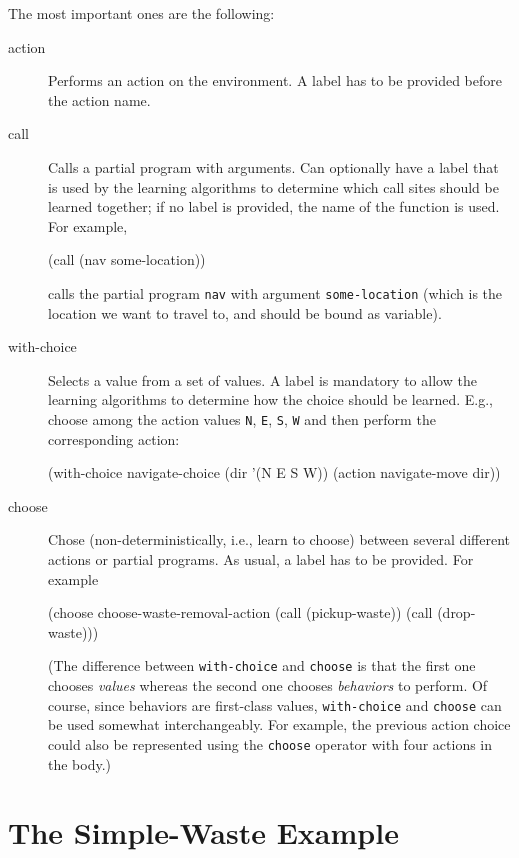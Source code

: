 \documentclass[a4paper]{amsart}
\begin{document}
The most important ones are the following:
\begin{description}
\item[action] Performs an action on the environment.  A label has to
  be provided before the action name.
\item[call] Calls a partial program with arguments.  Can optionally
  have a label that is used by the learning algorithms to determine
  which call sites should be learned together; if no label is
  provided, the name of the function is used.  For example,
  \begin{Code}
    (call (nav some-location))
  \end{Code}
  calls the partial program \texttt{nav} with argument
  \texttt{some-location} (which is the location we want to travel to,
  and should be bound as variable).
\item[with-choice] Selects a value from a set of values.  A label is
  mandatory to allow the learning algorithms to determine how the
  choice should be learned.  E.g., choose among the action values
  \texttt{N}, \texttt{E}, \texttt{S}, \texttt{W} and then perform the
  corresponding action:
  \begin{Code}
    (with-choice navigate-choice (dir '(N E S W))
      (action navigate-move dir))
  \end{Code}
\item[choose] Chose (non-deterministically, i.e., learn to choose)
  between several different actions or partial programs.  As usual, a
  label has to be provided.  For example
  \begin{Code}
    (choose choose-waste-removal-action
            (call (pickup-waste))
            (call (drop-waste)))
  \end{Code}
  (The difference between \texttt{with-choice} and \texttt{choose} is
  that the first one chooses \emph{values} whereas the second one
  chooses \emph{behaviors} to perform.  Of course, since behaviors are
  first-class values, \texttt{with-choice} and \texttt{choose} can be
  used somewhat interchangeably.  For example, the previous action
  choice could also be represented using the \texttt{choose} operator
  with four actions in the body.)
\end{description}


\section{The Simple-Waste Example}
\label{sec:simple-waste}
\end{document}
